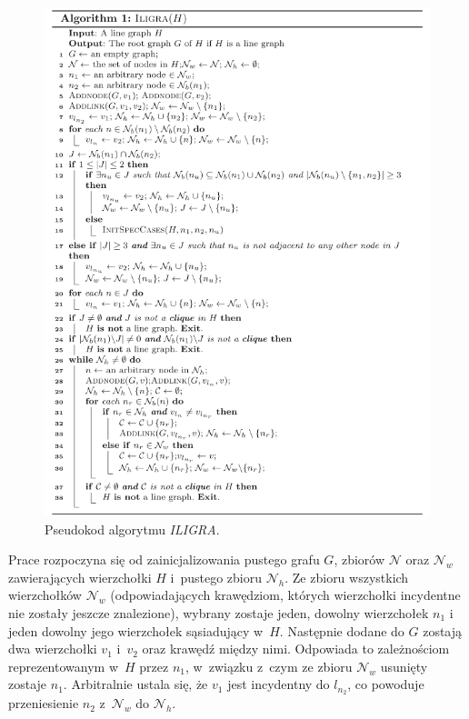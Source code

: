 \documentclass{article}
\begin{document}
\begin{figure}[h!]
	\includegraphics[width=\linewidth]{algo.png}
	\caption{Pseudokod algorytmu \textit{ILIGRA}.}
	\label{fig:algo}
\end{figure}

Prace rozpoczyna się od zainicjalizowania pustego grafu $G$, zbiorów $\mathcal{N}$ oraz $\mathcal{N}_w$ zawierających wierzchołki $H$ i~pustego zbioru $\mathcal{N}_h$. Ze zbioru wszystkich wierzchołków $\mathcal{N}_w$ (odpowiadających krawędziom, których wierzchołki incydentne nie zostały jeszcze znalezione), wybrany zostaje jeden, dowolny wierzchołek $n_1$ i jeden dowolny jego wierzchołek sąsiadujący w~$H$. Następnie dodane do $G$ zostają dwa wierzchołki $v_1$ i~$v_2$ oraz krawędź między nimi. Odpowiada to zależnościom reprezentowanym w~$H$ przez $n_1$, w~związku z~czym ze zbioru $\mathcal{N}_w$ usunięty zostaje $n_1$. Arbitralnie ustala się, że $v_1$ jest incydentny do $l_{n_2}$, co powoduje przeniesienie $n_2$ z~$\mathcal{N}_w$ do $\mathcal{N}_h$.
\end{document}
